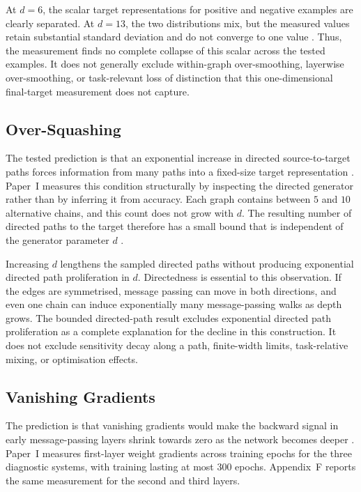 At $d=6$, the scalar target representations for positive and negative examples are clearly separated.
At $d=13$, the two distributions mix, but the measured values retain substantial standard deviation and do not converge to one value \cite{zhou2025glora}.
Thus, the measurement finds no complete collapse of this scalar across the tested examples.
It does not generally exclude within-graph over-smoothing, layerwise over-smoothing, or task-relevant loss of distinction that this one-dimensional final-target measurement does not capture.

\subsection{Over-Squashing}

The tested prediction is that an exponential increase in directed source-to-target paths forces information from many paths into a fixed-size target representation \cite{alon2021bottleneck}.
Paper~I measures this condition structurally by inspecting the directed generator rather than by inferring it from accuracy.
Each graph contains between $5$ and $10$ alternative chains, and this count does not grow with $d$.
The resulting number of directed paths to the target therefore has a small bound that is independent of the generator parameter $d$ \cite{zhou2025glora}.

Increasing $d$ lengthens the sampled directed paths without producing exponential directed path proliferation in $d$.
Directedness is essential to this observation.
If the edges are symmetrised, message passing can move in both directions, and even one chain can induce exponentially many message-passing walks as depth grows.
The bounded directed-path result excludes exponential directed path proliferation as a complete explanation for the decline in this construction.
It does not exclude sensitivity decay along a path, finite-width limits, task-relative mixing, or optimisation effects.

\subsection{Vanishing Gradients}

The prediction is that vanishing gradients would make the backward signal in early message-passing layers shrink towards zero as the network becomes deeper \cite{glorot2010difficulty}.
Paper~I measures first-layer weight gradients across training epochs for the three diagnostic systems, with training lasting at most $300$ epochs.
Appendix~F reports the same measurement for the second and third layers.

